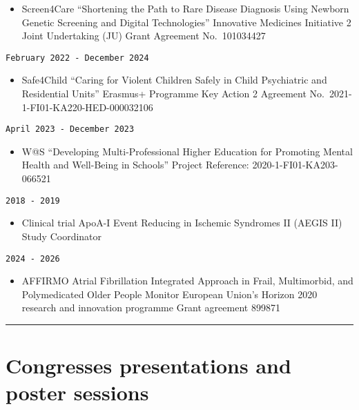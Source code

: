 \documentclass[
  12pt,
  letterpaper,
  DIV=11,
  numbers=noendperiod]{scrartcl}
\providecommand{\tightlist}{%
  \setlength{\itemsep}{0pt}\setlength{\parskip}{0pt}}\usepackage{longtable,booktabs,array}
\begin{document}
\begin{itemize}
\tightlist
\item
  Screen4Care \textbar{} ``Shortening the Path to Rare Disease Diagnosis
  Using Newborn Genetic Screening and Digital Technologies'' \textbar{}
  Innovative Medicines Initiative 2 Joint Undertaking (JU) \textbar{}
  Grant Agreement No.~101034427
\end{itemize}

\texttt{February\ 2022\ -\ December\ 2024}

\begin{itemize}
\tightlist
\item
  Safe4Child \textbar{} ``Caring for Violent Children Safely in Child
  Psychiatric and Residential Units'' \textbar{} Erasmus+ Programme
  \textbar{} Key Action 2 \textbar{} Agreement
  No.~2021-1-FI01-KA220-HED-000032106
\end{itemize}

\texttt{April\ 2023\ -\ December\ 2023}

\begin{itemize}
\tightlist
\item
  W@S \textbar{} ``Developing Multi-Professional Higher Education for
  Promoting Mental Health and Well-Being in Schools'' \textbar{} Project
  Reference: 2020-1-FI01-KA203-066521
\end{itemize}

\texttt{2018\ -\ 2019}

\begin{itemize}
\tightlist
\item
  Clinical trial \textbar{} ApoA-I Event Reducing in Ischemic Syndromes
  II (AEGIS II) \textbar{} Study Coordinator
\end{itemize}

\texttt{2024\ -\ 2026}

\begin{itemize}
\tightlist
\item
  AFFIRMO \textbar{} Atrial Fibrillation Integrated Approach in Frail,
  Multimorbid, and Polymedicated Older People \textbar{} Monitor
  \textbar{} European Union's Horizon 2020 research and innovation
  programme \textbar{} Grant agreement 899871
\end{itemize}

\begin{center}\rule{0.5\linewidth}{0.5pt}\end{center}

\section{Congresses presentations and poster
sessions}\label{congresses-presentations-and-poster-sessions}
\end{document}
